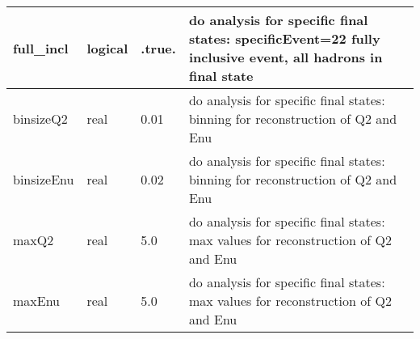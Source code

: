 \documentclass{article}
\begin{document}
\begin{longtable}{llll}
\midrule
full\_incl & \begin{minipage}[t]{2cm}logical\end{minipage} & \begin{minipage}[t]{2cm}.true.\end{minipage} & \begin{minipage}[t]{12cm}do analysis for specific final states: specificEvent=22 fully inclusive event, all hadrons in final state\end{minipage}\\*
\midrule
binsizeQ2 & \begin{minipage}[t]{2cm}real\end{minipage} & \begin{minipage}[t]{2cm}0.01\end{minipage} & \begin{minipage}[t]{12cm}do analysis for specific final states: binning for reconstruction of Q2 and Enu\end{minipage}\\*
\midrule
binsizeEnu & \begin{minipage}[t]{2cm}real\end{minipage} & \begin{minipage}[t]{2cm}0.02\end{minipage} & \begin{minipage}[t]{12cm}do analysis for specific final states: binning for reconstruction of Q2 and Enu\end{minipage}\\*
\midrule
maxQ2 & \begin{minipage}[t]{2cm}real\end{minipage} & \begin{minipage}[t]{2cm}5.0\end{minipage} & \begin{minipage}[t]{12cm}do analysis for specific final states: max values for reconstruction of Q2 and Enu\end{minipage}\\*
\midrule
maxEnu & \begin{minipage}[t]{2cm}real\end{minipage} & \begin{minipage}[t]{2cm}5.0\end{minipage} & \begin{minipage}[t]{12cm}do analysis for specific final states: max values for reconstruction of Q2 and Enu\end{minipage}\\*
\midrule

\end{longtable}
\end{document}

